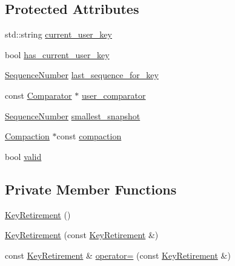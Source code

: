 \subsection*{Protected Attributes}
\begin{DoxyCompactItemize}
\item 
std\+::string \hyperlink{classleveldb_1_1_key_retirement_a08d9c4469154d978fcc0d3ebfb48b2ee}{current\+\_\+user\+\_\+key}
\item 
bool \hyperlink{classleveldb_1_1_key_retirement_acd5b7004a8c904344af8c4db2f0ae289}{has\+\_\+current\+\_\+user\+\_\+key}
\item 
\hyperlink{namespaceleveldb_a5481ededd221c36d652c371249f869fa}{Sequence\+Number} \hyperlink{classleveldb_1_1_key_retirement_a00dd96ba9da12755dc773fa04a365e10}{last\+\_\+sequence\+\_\+for\+\_\+key}
\item 
const \hyperlink{structleveldb_1_1_comparator}{Comparator} $\ast$ \hyperlink{classleveldb_1_1_key_retirement_adde66b0f56eef7cf588736c061b98599}{user\+\_\+comparator}
\item 
\hyperlink{namespaceleveldb_a5481ededd221c36d652c371249f869fa}{Sequence\+Number} \hyperlink{classleveldb_1_1_key_retirement_adf0abff6ce4abf9edb64880141df43be}{smallest\+\_\+snapshot}
\item 
\hyperlink{classleveldb_1_1_compaction}{Compaction} $\ast$const \hyperlink{classleveldb_1_1_key_retirement_a7562cd33899a4911d6706a2b803c96ad}{compaction}
\item 
bool \hyperlink{classleveldb_1_1_key_retirement_a0d0ec2056ba235eb23f44b9ac1ebdec9}{valid}
\end{DoxyCompactItemize}
\subsection*{Private Member Functions}
\begin{DoxyCompactItemize}
\item 
\hyperlink{classleveldb_1_1_key_retirement_a1c9584bfd5df7244866effcde405606c}{Key\+Retirement} ()
\item 
\hyperlink{classleveldb_1_1_key_retirement_ad5e0a9cf0a906ebcc03906c14b90a4d8}{Key\+Retirement} (const \hyperlink{classleveldb_1_1_key_retirement}{Key\+Retirement} \&)
\item 
const \hyperlink{classleveldb_1_1_key_retirement}{Key\+Retirement} \& \hyperlink{classleveldb_1_1_key_retirement_a8659188a0bac96580d54a0dcd54b1e5c}{operator=} (const \hyperlink{classleveldb_1_1_key_retirement}{Key\+Retirement} \&)
\end{DoxyCompactItemize}


